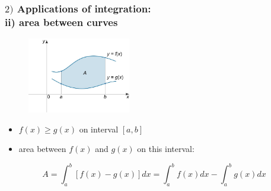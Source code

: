 \documentclass[english,14pt]{beamer}
\begin{document}

\begin{frame}[fragile]

\frametitle{$2)$ Applications of integration: \\ \qquad ii) area between curves}


\vspace*{-10mm}
\begin{figure}[ht]
	\centering
	\includegraphics[width=0.4\textwidth]{figures/areabetweenfandg}
\end{figure}
\vspace*{-9mm}

\begin{itemize}
	\item $f(x) \geq g(x)$ on interval $[a,b]$
	\item area between $f(x)$ and $g(x)$ on this interval:
\end{itemize}
\vspace*{-2mm}
\[
A = \int_a^b \left[ f(x) - g(x) \right] dx = \int_a^b f(x)  dx - \int_a^b g(x) dx 
\]



\end{frame}

\end{document}

